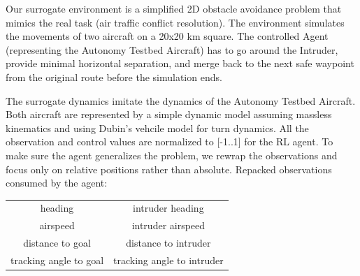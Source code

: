 Our surrogate environment is a simplified 2D obstacle avoidance problem that mimics the real task (air traffic conflict resolution). 
The environment simulates the movements of two aircraft on a 20x20 km square. The controlled Agent (representing the Autonomy Testbed Aircraft) has to go around the Intruder, provide minimal horizontal separation, and merge back to the next safe waypoint from the original route before the simulation ends.



The surrogate dynamics imitate the dynamics of the Autonomy Testbed Aircraft.
Both aircraft are represented by a simple dynamic model assuming massless kinematics and using Dubin's vehcile model for turn dynamics.
All the observation and control values are normalized to [-1..1] for the RL agent.
To make sure the agent generalizes the problem, we rewrap the observations and focus only on 
relative positions rather than absolute.  Repacked observations consumed by the agent:
	\begin{center}
		\begin{tabular}{|| c | c ||} 
			\hline
			heading & intruder heading\\
			airspeed & intruder airspeed\\
			distance to goal & distance to intruder\\
			tracking angle to goal & tracking angle to intruder\\
			\hline
		\end{tabular}
	\end{center}

